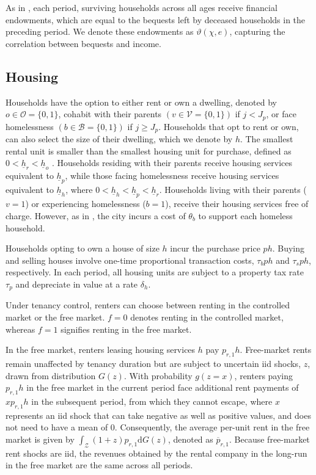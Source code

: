 \documentclass[parskip=full]{article}
\begin{document}
As in \citet{kkk-2021}, each period, surviving households across all ages receive financial endowments, which are equal to the bequests left by deceased households in the preceding period. We denote these endowments as $\vartheta (\chi,e)$, capturing the correlation between bequests and income.

\subsection{Housing}\label{subsection:housing_choice}

Households have the option to either rent or own a dwelling, denoted by $o \in \mathcal{O}=\{0,1\}$, cohabit with their parents $\left(v \in \mathcal{V}=\{0,1\}\right)$ if $j<J_{p}$, or face homelessness $\left(b \in \mathcal{B}=\{0,1\}\right)$ if $j \geq J_{p}$. Households that opt to rent or own, can also select the size of their dwelling, which we denote by $h$. The smallest rental unit is smaller than the smallest housing unit for purchase, defined as $0<\underline{h}_{r}<\underline{h}_{o}$ \citep{gervais,sommeretal-2013,sommersullivan-2017,kaplanetal-2019}. Households residing with their parents receive housing services equivalent to $\underline{h}_{p}$, while those facing homelessness receive housing services equivalent to $\underline{h}_{h}$, where $0<\underline{h}_{h}<\underline{h}_{p}<\underline{h}_{r}$. Households living with their parents ($v=1$) or experiencing homelessness ($b=1$), receive their housing services free of charge. However, as in \citet{abramson-2024}, the city incurs a cost of $\theta_{b}$ to support each homeless household. 

Households opting to own a house of size $h$ incur the purchase price $p h$. Buying and selling houses involve one-time proportional transaction costs, $\tau_{b} p h$ and $\tau_{s} p h$, respectively. In each period, all housing units are subject to a property tax rate $\tau_{p}$ and depreciate in value at a rate $\delta_h$.

Under tenancy control, renters can choose between renting in the controlled market or the free market. $f=0$ denotes renting in the controlled market, whereas $f=1$ signifies renting in the free market.

In the free market, renters leasing housing services $h$ pay $p_{r,1} h$. Free-market rents remain unaffected by tenancy duration but are subject to uncertain iid shocks, $z$, drawn from distribution $G(z)$. With probability $g(z=x)$, renters paying $p_{r,1}h$ in the free market in the current period face additional rent payments of $x p_{r,1}h$ in the subsequent period, from which they cannot escape, where $x$ represents an iid shock that can take negative as well as positive values, and does not need to have a mean of 0. Consequently, the average per-unit rent in the free market is given by $\int_\mathcal{Z}(1+z)p_{r,1}\mathrm{d}G(z)$, denoted as $\overline{p}_{r,1}$. Because free-market rent shocks are iid, the revenues obtained by the rental company in the long-run in the free market are the same across all periods.
\end{document}
